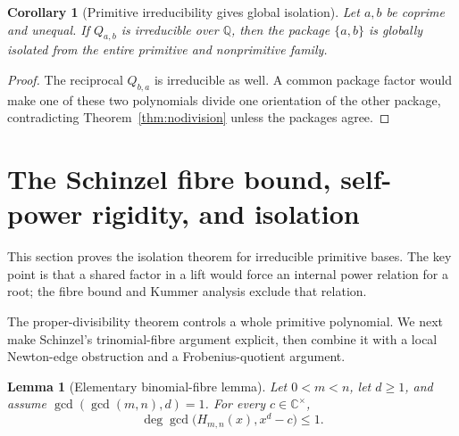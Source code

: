 \documentclass[11pt]{article}
\numberwithin{equation}{section}
\newtheorem{lemma}[theorem]{Lemma}
\newtheorem{corollary}[theorem]{Corollary}
\theoremstyle{definition}
\newcommand{\Q}{\mathbb Q}
\newcommand{\C}{\mathbb C}
\begin{document}
\begin{corollary}[Primitive irreducibility gives global isolation]
\label{cor:primitiveisolation}
Let \(a,b\) be coprime and unequal.  If \(Q_{a,b}\) is irreducible over
\(\Q\), then the package \(\{a,b\}\) is globally isolated from the entire
primitive and nonprimitive family.
\end{corollary}

\begin{proof}
The reciprocal \(Q_{b,a}\) is irreducible as well.  A common package factor
would make one of these two polynomials divide one orientation of the other
package, contradicting Theorem~\ref{thm:nodivision} unless the packages agree.
\end{proof}

\section{The Schinzel fibre bound, self-power rigidity, and isolation}

This section proves the isolation theorem for irreducible primitive bases.  The key point is that a shared factor in a lift would force an internal power relation for a root; the fibre bound and Kummer analysis exclude that relation.
\label{sec:kummer}

The proper-divisibility theorem controls a whole primitive polynomial.  We
next make Schinzel's trinomial-fibre argument explicit, then combine it with a
local Newton-edge obstruction and a Frobenius-quotient argument.

\begin{lemma}[Elementary binomial-fibre lemma]\label{lem:schinzelfibre}
Let \(0<m<n\), let \(d\geq1\), and assume
\(\gcd(\gcd(m,n),d)=1\).  For every \(c\in\C^\times\),
\[
 \deg\gcd\bigl(H_{m,n}(x),x^d-c\bigr)\leq1.
\]
\end{lemma}
\end{document}
